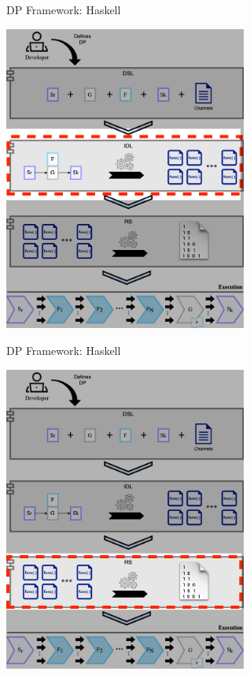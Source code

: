 \documentclass{beamer}
\begin{document}
  \begin{frame}[fragile]{DP Framework: Haskell}
    \begin{center}
      \includegraphics[width = 0.6\textwidth, height = 0.8\textheight]{dpf_haskell_v3-2}
    \end{center}
  \end{frame}

  \begin{frame}[fragile]{DP Framework: Haskell}
    \begin{center}
      \includegraphics[width = 0.6\textwidth, height = 0.8\textheight]{dpf_haskell_v3-3}
    \end{center}
  \end{frame}
\end{document}
